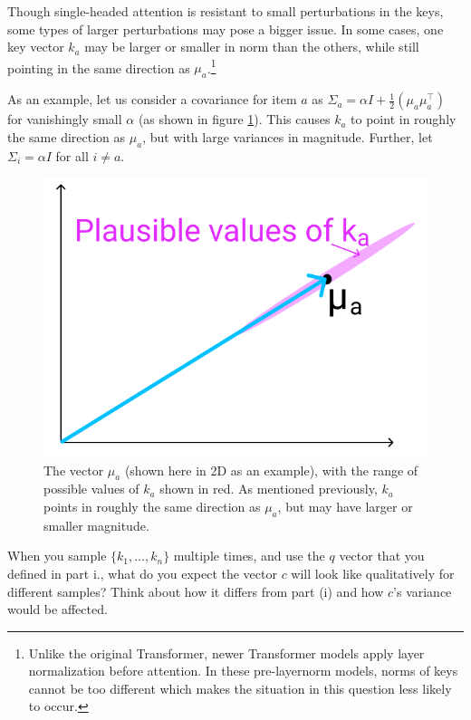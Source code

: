 \begin{parts}
\begin{subparts}
{}

\subpart[3] Though single-headed attention is resistant to small perturbations in the keys, some types of larger perturbations may pose a bigger issue. In some cases, one key vector $k_a$ may be larger or smaller in norm than the others, while still pointing in the same direction as $\mu_a$.\footnote{Unlike the original Transformer, newer Transformer models apply layer normalization before attention. In these pre-layernorm models, norms of keys cannot be too different which makes the situation in this question less likely to occur.}

As an example, let us consider a covariance for item $a$ as $\Sigma_a = \alpha I + \frac{1}{2}(\mu_a\mu_a^\top)$ for vanishingly small $\alpha$ (as shown in figure \ref{ka_plausible}). This causes $k_a$ to point in roughly the same direction as $\mu_a$, but with large variances in magnitude. Further, let $\Sigma_i = \alpha I$ for all $i \neq a$.
\begin{figure}[h]
\centering
\captionsetup{justification=centering,margin=2cm}
\includegraphics[width=0.35\linewidth]{images/ka_plausible.png}
\caption{The vector $\mu_a$ (shown here in 2D as an example), with the range of possible values of $k_a$ shown in red. As mentioned previously, $k_a$ points in roughly the same direction as $\mu_a$, but may have larger or smaller magnitude.}
\label{ka_plausible}
\end{figure}

When you sample $\{k_1,\dots,k_n\}$ multiple times, and use the $q$ vector that you defined in part i., what do you expect the vector $c$ will look like qualitatively for different samples? Think about how it differs from part (i) and how $c$'s variance would be affected.

\end{subparts}
\end{parts}
